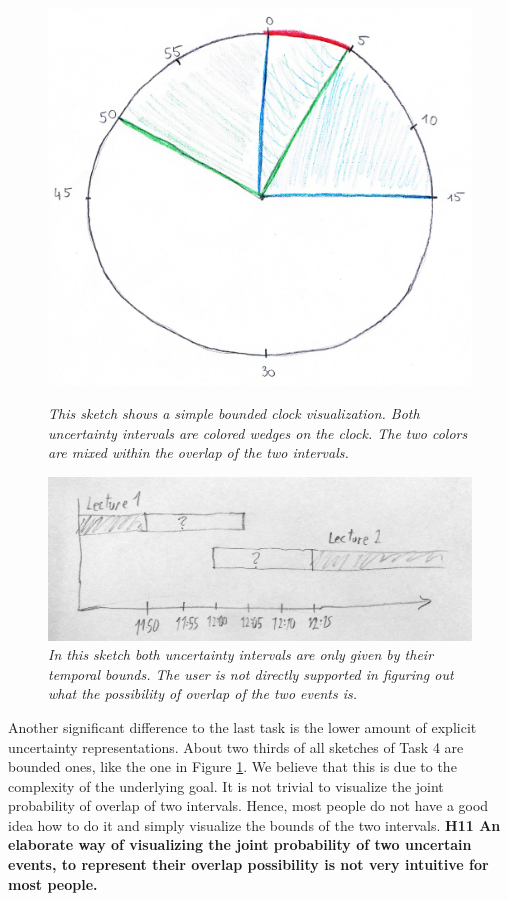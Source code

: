 \begin{figure}[H]
	\begin{minipage}{.5\textwidth}
		\centering
		\captionsetup{width=0.8\textwidth}
		\includegraphics[height=0.6\textwidth]{figures/t4clock.png}
		\caption{\textit{This sketch shows a simple bounded clock visualization. Both uncertainty intervals are colored wedges on the clock. The two colors are mixed within the overlap of the two intervals.}}
		\label{fig:t4clock}
	\end{minipage}
	\begin{minipage}{.5\textwidth}
		\centering
		\captionsetup{width=1.0\textwidth}
		\includegraphics[height=0.4\textwidth]{figures/t4bounded.jpg}
		\caption{\textit{In this sketch both uncertainty intervals are only given by their temporal bounds. The user is not directly supported in figuring out what the possibility of overlap of the two events is.}}
		\label{fig:t4bounded}
	\end{minipage}
\end{figure}

Another significant difference to the last task is the lower amount of explicit uncertainty representations. About two thirds of all sketches of Task 4 are bounded ones, like the one in Figure \ref{fig:t4bounded}. We believe that this is due to the complexity of the underlying goal. It is not trivial to visualize the joint probability of overlap of two intervals. Hence, most people do not have a good idea how to do it and simply visualize the bounds of the two intervals. \textbf{H11 An elaborate way of visualizing the joint probability of two uncertain events, to represent their overlap possibility is not very intuitive for most people.} \par \medskip

